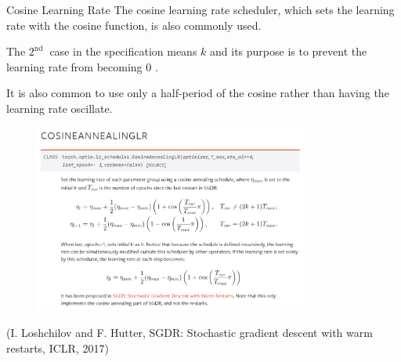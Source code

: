 \begin{frame}[allowframebreaks]

\begin{myconceptblock}{6.28}{Cosine Learning Rate}
    The cosine learning rate scheduler, which sets the learning rate with the cosine function, is also commonly used.

    The $2^{\text {nd }}$ case in the specification means $k$ and its purpose is to prevent the learning rate from becoming 0 .

    It is also common to use only a half-period of the cosine rather than having the learning rate oscillate.

    \begin{figure}[H]
        \centering
        \includegraphics[width=0.8\textwidth]{.././assets/6.10.png}
    \end{figure}

    (I. Loshchilov and F. Hutter, SGDR: Stochastic gradient descent with warm restarts, ICLR, 2017)
\end{myconceptblock}

\end{frame}


